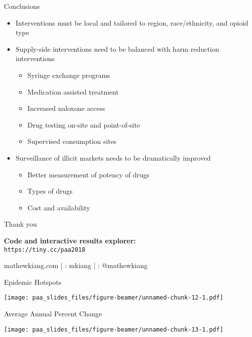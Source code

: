 \documentclass[ignorenonframetext,compress]{beamer}
\providecommand{\tightlist}{%
  \setlength{\itemsep}{0pt}\setlength{\parskip}{0pt}}
\begin{document}
\begin{frame}{Conclusions}

\begin{itemize}[<+->]
\tightlist
\item
  Interventions must be local and tailored to region, race/ethnicity,
  and opioid type
\item
  Supply-side interventions need to be balanced with harm reduction
  interventions

  \begin{itemize}[<+->]
  \tightlist
  \item
    Syringe exchange programs
  \item
    Medication assisted treatment
  \item
    Increased naloxone access
  \item
    Drug testing on-site and point-of-site
  \item
    Supervised consumption sites
  \end{itemize}
\item
  Surveillance of illicit markets needs to be dramatically improved

  \begin{itemize}[<+->]
  \tightlist
  \item
    Better measurement of potency of drugs
  \item
    Types of drugs
  \item
    Cost and availability
  \end{itemize}
\end{itemize}

\end{frame}

\begin{frame}{Thank you}

\Large

\begin{center}
\textbf{Code and interactive results explorer:} \\ \texttt{https://tiny.cc/paa2018} \newline \newline

 mathewkiang.com | \faGithub: mkiang | \faTwitter: @mathewkiang 

\end{center}

\end{frame}

\begin{frame}{Epidemic Hotspots}

\texttt{[image: paa\_slides\_files/figure-beamer/unnamed-chunk-12-1.pdf]}

\end{frame}

\begin{frame}{Average Annual Percent Change}

\texttt{[image: paa\_slides\_files/figure-beamer/unnamed-chunk-13-1.pdf]}

\end{frame}
\end{document}
